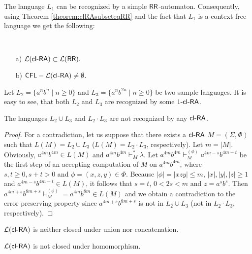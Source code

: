 The language $L_1$ can be recognized by a simple $\RR$-automaton. Consequently, using Theorem \ref{theorem:clRAsubseteqRR} and the fact that $L_1$ is a context-free language we get the following:

\begin{corollary}\label{corollary:clRasubsetRRWW}\hspace{1 cm} \
\begin{enumerate}
    \item[a)]
        $\calL{\clRA} \subset \calL{\RR}.$
    \item[b)] \label{co:clRAnotallCFL}
        $\CFL - \calL{\clRA} \not= \emptyset$.
\end{enumerate}
\end{corollary}

Let $L_2 = \{a^nb^n \mid n\ge 0\}$ and $L_3 = \{a^nb^{2n} \mid n \ge 0\}$ be two sample languages. It is easy to see, that both $L_2$ and $L_3$ are recognized by some $\kclRA[1]$.

\begin{theorem}\label{theorem:L_2_L_3}
The languages $L_2 \cup L_3$ and $L_2 \cdot L_3$ are not recognized by any $\clRA$.
\end{theorem}

\begin{proof}
For a contradiction, let us suppose that there exists a $\clRA$ $M = (\Sigma,\Phi)$ such that $L(M) = L_2 \cup L_3$ ($L(M) = L_2 \cdot L_3$, respectively). Let $m = |M|$. Obviously, $a^{4m} b^{4m} \in L(M)$ and $a^{4m} b^{4m} \vdash_M^* \lambda$. Let $a^{4m} b^{4m} \vdash_M^{(\phi)} a^{4m-s} b^{4m-t}$ be the first step of an accepting computation of $M$ on $a^{4m} b^{4m}$, where $s, t \ge 0, s+t > 0$ and $\phi = (x, z, y) \in \Phi$. Because $|\phi| = |xzy| \le m$, $|x|, |y|, |z| \ge 1$ and $a^{4m-s} b^{4m-t} \in L(M)$, it follows that $s = t$, $0 < 2s < m$ and $z = a^sb^s$. Then $a^{4m+s} b^{8m+s} \vdash_M^{(\phi)} = a^{4m} b^{8m} \in L(M)$ and we obtain a contradiction to the error preserving property since $a^{4m+s} b^{8m+s}$ is not in $L_2 \cup L_3$ (not in $L_2 \cdot L_3$, respectively).
\end{proof}

\begin{corollary}
$\calL{\clRA}$ is neither closed under union nor concatenation.
\end{corollary}

\begin{corollary}
$\calL{\clRA}$ is not closed under homomorphism.
\end{corollary}

